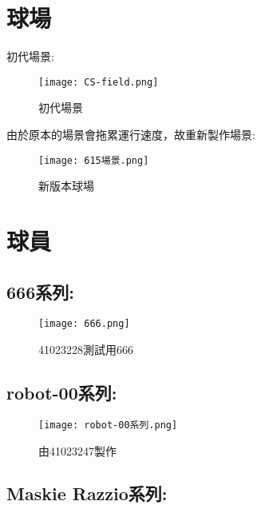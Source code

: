 \newpage
\section{球場}
\begin{flushleft}
\fontsize{14pt}{20pt}\sectionef\hspace{12pt}\quad 初代場景:
\end{flushleft}
\begin{figure}[h]
\texttt{[image: CS-field.png]}
\caption{初代場景}
\end{figure}

\begin{flushleft}
\fontsize{14pt}{20pt}\sectionef\hspace{12pt}\quad 由於原本的場景會拖累運行速度，故重新製作場景:
\end{flushleft}
\begin{figure}[h]
\texttt{[image: 615場景.png]}
\caption{新版本球場}
\end{figure}

\newpage
\section{球員}

\subsection{666系列:}
\begin{figure}[h]
\texttt{[image: 666.png]}
\caption{41023228測試用666}
\end{figure}

\subsection{robot-00系列:}
\begin{figure}[h]
\texttt{[image: robot-00系列.png]}
\caption{由41023247製作}
\end{figure}

\newpage
\subsection{Maskie Razzio系列:}

